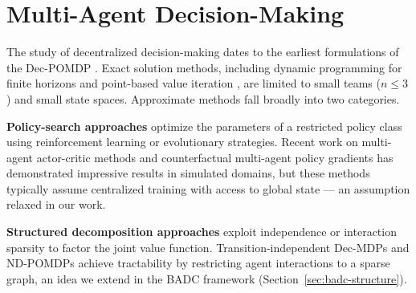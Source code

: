 \section{Multi-Agent Decision-Making}

The study of decentralized decision-making dates to the earliest formulations
of the Dec-POMDP \citep{bernstein2002complexity}. Exact solution methods,
including dynamic programming for finite horizons \citep{hansen2004dynamic}
and point-based value iteration \citep{spaan2005perseus}, are limited to
small teams ($n \leq 3$) and small state spaces. Approximate methods fall
broadly into two categories.

\textbf{Policy-search approaches} optimize the parameters of a restricted
policy class using reinforcement learning or evolutionary strategies.
Recent work on multi-agent actor-critic methods \citep{lowe2017maddpg} and
counterfactual multi-agent policy gradients \citep{foerster2018counterfactual}
has demonstrated impressive results in simulated domains, but these methods
typically assume centralized training with access to global state --- an
assumption relaxed in our work.

\textbf{Structured decomposition approaches} exploit independence or
interaction sparsity to factor the joint value function. Transition-independent
Dec-MDPs \citep{becker2004transition} and ND-POMDPs
\citep{nair2005networked} achieve tractability by restricting agent
interactions to a sparse graph, an idea we extend in the BADC framework
(Section~\ref{sec:badc-structure}).
